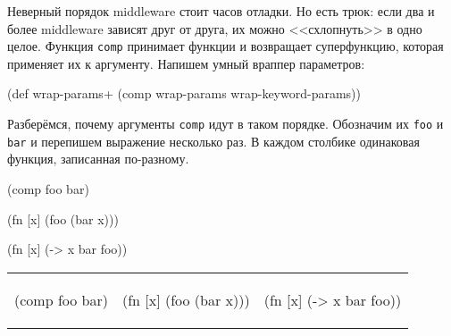Неверный порядок middleware стоит часов отладки. Но есть трюк: если два и более
middleware зависят друг от друга, их можно <<схлопнуть>> в одно целое. Функция
\verb|comp| принимает функции и возвращает суперфункцию, которая применяет их
к аргументу. Напишем умный враппер параметров:


\begin{english}
  \begin{clojure}
(def wrap-params+ (comp wrap-params wrap-keyword-params))
  \end{clojure}
\end{english}

Разберёмся, почему аргументы \verb|comp| идут в таком порядке. Обозначим
их \verb|foo| и \verb|bar| и перепишем выражение несколько раз. В каждом
столбике одинаковая функция, записанная по-разному.

\ifx\devicetype\mobile

\begin{english}
  \begin{clojure}
(comp foo bar)

(fn [x]
  (foo (bar x)))

(fn [x] (-> x
            bar
            foo))
  \end{clojure}
\end{english}

\else

\noindent
\begin{tabular}{ @{}p{3.2cm} @{}p{3.5cm} @{}p{3.5cm} }

\begin{english}
  \begin{clojure}
(comp foo bar)
  \end{clojure}
\end{english}

&

\begin{english}
  \begin{clojure}
(fn [x]
  (foo (bar x)))
  \end{clojure}
\end{english}

&

\begin{english}
  \begin{clojure}
(fn [x] (-> x
            bar
            foo))
  \end{clojure}
\end{english}

\end{tabular}

